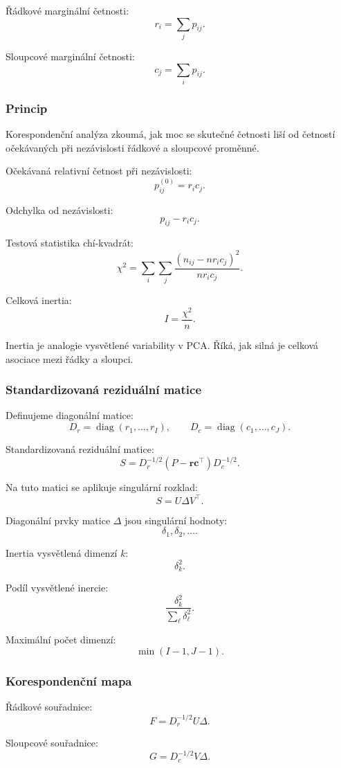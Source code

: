 Řádkové marginální četnosti:
\[
r_i = \sum_j p_{ij}.
\]

Sloupcové marginální četnosti:
\[
c_j = \sum_i p_{ij}.
\]

\subsubsection{Princip}

Korespondenční analýza zkoumá, jak moc se skutečné četnosti liší od četností očekávaných při nezávislosti
řádkové a sloupcové proměnné.

Očekávaná relativní četnost při nezávislosti:
\[
p_{ij}^{(0)}=r_i c_j.
\]

Odchylka od nezávislosti:
\[
p_{ij}-r_i c_j.
\]

Testová statistika chí-kvadrát:
\[
\chi^2
=
\sum_i\sum_j
\frac{(n_{ij}-nr_ic_j)^2}{nr_ic_j}.
\]

Celková inertia:
\[
I
=
\frac{\chi^2}{n}.
\]

Inertia je analogie vysvětlené variability v PCA. Říká, jak silná je celková asociace mezi řádky a sloupci.

\subsubsection{Standardizovaná reziduální matice}

Definujeme diagonální matice:
\[
D_r=\operatorname{diag}(r_1,\ldots,r_I),
\qquad
D_c=\operatorname{diag}(c_1,\ldots,c_J).
\]

Standardizovaná reziduální matice:
\[
S
=
D_r^{-1/2}
(P-\mathbf{r}\mathbf{c}^\top)
D_c^{-1/2}.
\]

Na tuto matici se aplikuje singulární rozklad:
\[
S
=
U\Delta V^\top.
\]

Diagonální prvky matice $\Delta$ jsou singulární hodnoty:
\[
\delta_1,\delta_2,\ldots.
\]

Inertia vysvětlená dimenzí $k$:
\[
\delta_k^2.
\]

Podíl vysvětlené inercie:
\[
\frac{\delta_k^2}{\sum_\ell \delta_\ell^2}.
\]

Maximální počet dimenzí:
\[
\min(I-1,J-1).
\]

\subsubsection{Korespondenční mapa}

Řádkové souřadnice:
\[
F
=
D_r^{-1/2}U\Delta.
\]

Sloupcové souřadnice:
\[
G
=
D_c^{-1/2}V\Delta.
\]

